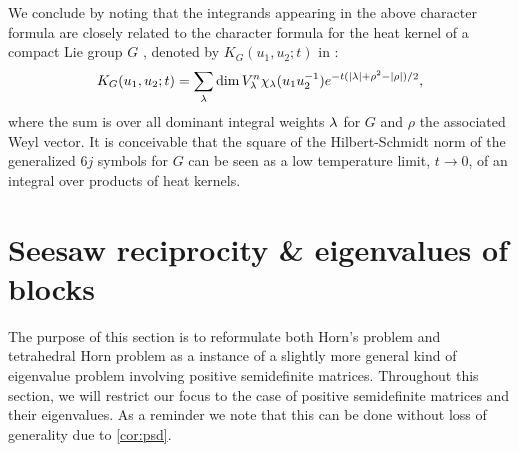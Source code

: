 \documentclass[notitlepage, 10pt]{article}
\begin{document}
We conclude by noting that the integrands appearing in the above character formula are closely related to the character formula for the heat kernel of a compact Lie group $G$ \cite{fegan1978heat}, denoted by $K_{G}(u_1, u_2 ; t)$ in \cite{mcswiggen2021harish}:
\begin{equation}
    K_{G}(u_1, u_2; t) = \sum_{\lambda} \dim V_{\lambda}^{n} \chi_{\lambda}(u_1 u_2^{-1}) e^{-t({|\lambda|+\rho}^{2} - \left|\rho\right|)/2},
\end{equation}
where the sum is over all dominant integral weights $\lambda$ for $G$ and $\rho$ the associated Weyl vector.
It is conceivable that the square of the Hilbert-Schmidt norm of the generalized $6j$ symbols for $G$ can be seen as a low temperature limit, $t \to 0$, of an integral over products of heat kernels.

\section{Seesaw reciprocity \& eigenvalues of blocks}
\label{sec:blocks_of_psd_matrices}

The purpose of this section is to reformulate both Horn's problem and tetrahedral Horn problem as a instance of a slightly more general kind of eigenvalue problem involving positive semidefinite matrices.
Throughout this section, we will restrict our focus to the case of positive semidefinite matrices and their eigenvalues.
As a reminder we note that this can be done without loss of generality due to \cref{cor:psd}.
\end{document}
